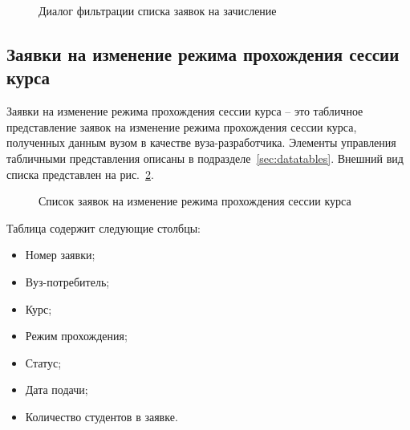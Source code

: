\begin{figure}[H]
	\caption{Диалог фильтрации списка заявок на зачисление}
	\label{img:agreement:enroll_req_list_filter}
\end{figure}

\subsection{Заявки на изменение режима прохождения сессии курса}

Заявки на изменение режима прохождения сессии курса -- это табличное представление заявок на изменение 
режима прохождения сессии курса, полученных данным вузом в качестве вуза-разработчика. 
Элементы управления табличными представления описаны в подразделе~\ref{sec:datatables}.
Внешний вид списка представлен на рис.~\ref{img:agreement:change_mode_req_list}. 

\begin{figure}[H]
	\caption{Список заявок на изменение режима прохождения сессии курса}
	\label{img:agreement:change_mode_req_list}
\end{figure}

Таблица содержит следующие столбцы:
\begin{itemize}
	\item Номер заявки;
	\item Вуз-потребитель;
	\item Курс;
	\item Режим прохождения;
	\item Статус;
	\item Дата подачи;
	\item Количество студентов в заявке.
\end{itemize}

